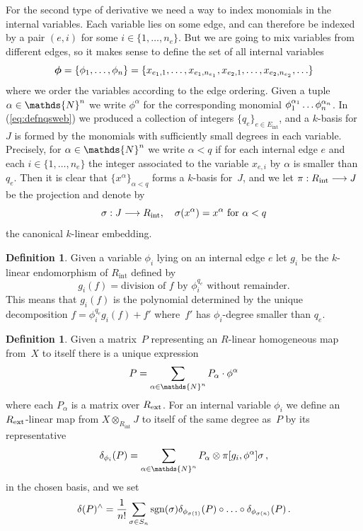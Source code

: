 \documentclass{compositio}
\theoremstyle{definition}
\newtheorem{definition}[theorem]{Definition}
\numberwithin{equation}{section}
\begin{document}
For the second type of derivative we need a way to index monomials in the internal variables. Each variable lies on some edge, and can therefore be indexed by a pair $(e,i)$ for some $i\in \{ 1,\ldots, n_{e}\}$. But we are going to mix variables from different edges, so it makes sense to define the set of all internal variables 
\[
\boldsymbol{\phi} = \{ \phi_1, \ldots, \phi_{n} \} = \{ x_{e_1,1}, \ldots, x_{e_1,n_{e_1}}, x_{e_2,1}, \ldots, x_{e_2,n_{e_2}}, \ldots \}
\]
where we order the variables according to the edge ordering. Given a tuple $\alpha \in \mathds{N}^\intvar$ we write $\phi^\alpha$ for the corresponding monomial $\phi_1^{\alpha_1} \ldots \phi_n^{\alpha_n}$. In (\ref{eq:defnqsweb}) we produced a collection of integers $\{q_e\}_{e \in E_{\text{int}}}$, and a $k$-basis for~$J$ is formed by the monomials with sufficiently small degrees in each variable. Precisely, for $\alpha \in \mathds{N}^\intvar$ we write $\alpha < q$ if for each internal edge $e$ and each $i\in\{1,\ldots,n_{e}\}$ the integer associated to the variable $x_{e,i}$ by $\alpha$ is smaller than $ q_e$. Then it is clear that $\{ x^\alpha \}_{\alpha < q}$ forms a $k$-basis for~$J$, and we let $\pi: R_{\text{int}} \longrightarrow J$ be the projection and denote by
\begin{equation}
\sigma: J \longrightarrow R_{\text{int}}, \quad \sigma(x^\alpha) = x^\alpha \text{ for } \alpha < q
\end{equation}
the canonical $k$-linear embedding.  

\begin{definition} Given a variable $\phi_i$ lying on an internal edge $e$ let $g_i$ be the $k$-linear endomorphism of $R_{\text{int}}$ defined by
\[
g_i(f) = \text{division of $f$ by $\phi_i^{q_e}$ without remainder}. 
\]
This means that $g_{i}(f)$ is the polynomial determined by the unique decomposition $f=\phi_i^{q_e} g_i(f) + f'$ where~$f'$ has $\phi_i$-degree smaller than $ q_e$. 
\end{definition}

\begin{definition} Given a matrix~$P$ representing an $R$-linear homogeneous map from~$X$ to itself there is a unique expression
\begin{equation}
P = \sum_{\alpha \in \mathds{N}^\intvar} P_\alpha \cdot \phi^\alpha
\end{equation}
where each $P_\alpha$ is a matrix over $R_{\text{ext}}$. For an internal variable $\phi_i$ we define an $R_{\text{ext}}$-linear map from $X \otimes_{R_{\text{int}}} J$ to itself of the same degree as~$P$ by its representative
$$
\delta_{\phi_i}(P) = \sum_{\alpha \in \mathds{N}^\intvar} P_\alpha \otimes \pi [g_i, \phi^\alpha] \sigma \, ,
$$
in the chosen basis, and we set
$$
\delta(P)^{\wedge} = \frac{1}{n!} \sum_{\sigma \in S_n} \textup{sgn}(\sigma) \delta_{\phi_{\sigma(1)}}(P) \circ \ldots \circ \delta_{\phi_{\sigma(n)}}(P) \, .
$$
\end{definition}
\end{document}
